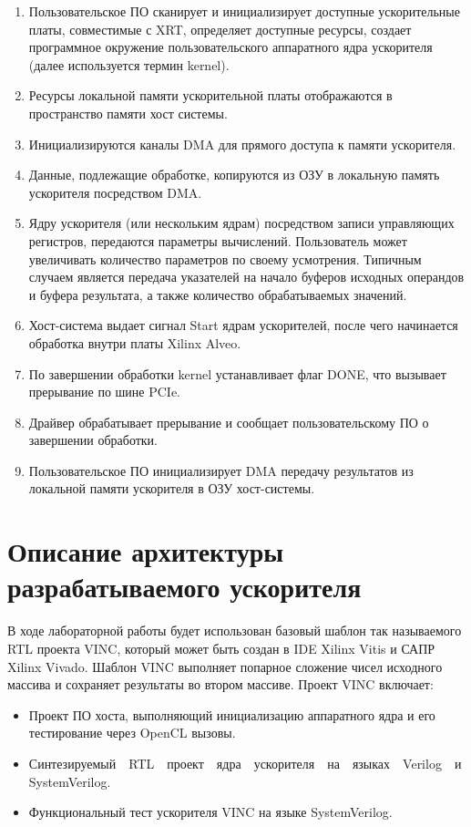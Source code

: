 \begin{enumerate}
    \item Пользовательское ПО сканирует и инициализирует доступные
ускорительные платы, совместимые с XRT, определяет доступные ресурсы, создает
программное окружение пользовательского аппаратного ядра ускорителя (далее
используется термин kernel).
    \item Ресурсы локальной памяти ускорительной платы отображаются в
пространство памяти хост системы.
    \item Инициализируются каналы DMA для прямого доступа к памяти ускорителя.
    \item Данные, подлежащие обработке, копируются из ОЗУ в локальную память
ускорителя посредством DMA.
    \item Ядру ускорителя (или нескольким ядрам) посредством записи управляющих
регистров, передаются параметры вычислений. Пользователь может увеличивать
количество параметров по своему усмотрения. Типичным случаем является передача
указателей на начало буферов исходных операндов и буфера результата, а также
количество обрабатываемых значений.
    \item Хост-система выдает сигнал Start ядрам ускорителей, после чего
начинается обработка внутри платы Xilinx Alveo.
    \item По завершении обработки kernel устанавливает флаг DONE, что вызывает
прерывание по шине PCIe.
    \item Драйвер обрабатывает прерывание и сообщает пользовательскому ПО о
завершении обработки.
    \item Пользовательское ПО инициализирует DMA передачу результатов из
локальной памяти ускорителя в ОЗУ хост-системы.
\end{enumerate}

\section{Описание архитектуры разрабатываемого ускорителя}

В ходе лабораторной работы будет использован базовый шаблон так называемого RTL
проекта VINC, который может быть создан в IDE Xilinx Vitis и САПР Xilinx
Vivado. Шаблон VINC выполняет попарное сложение чисел исходного массива и
сохраняет результаты во втором массиве. Проект VINC включает:

\begin{itemize}
    \item Проект ПО хоста, выполняющий инициализацию аппаратного ядра и его
тестирование через OpenCL вызовы.
    \item Синтезируемый~~RTL~~проект~~ядра~~ускорителя~~на~~языках~~Verilog~~и
SystemVerilog.
    \item Функциональный тест ускорителя VINC на языке SystemVerilog.
\end{itemize}

